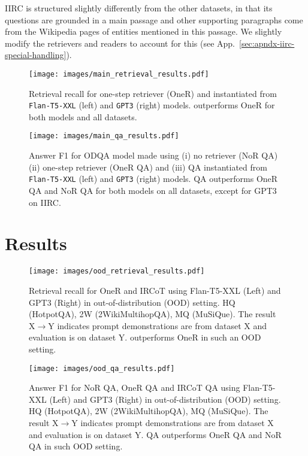 IIRC is structured slightly differently from the other datasets, in that its questions are grounded in a main passage and other supporting paragraphs come from the Wikipedia pages of entities mentioned in this passage. We slightly modify the retrievers and readers to account for this (see App.~\ref{sec:apndx-iirc-special-handling}).

\begin{figure*}[ht]
\centering
\texttt{[image: images/main\_retrieval\_results.pdf]}
\caption{Retrieval recall for one-step retriever (OneR) and \iconsys instantiated from \texttt{Flan-T5-XXL} (left) and \texttt{GPT3} (right) models. \iconsys outperforms OneR for both models and all datasets.}
\label{fig:main-retrieval-results}
\end{figure*}

\begin{figure*}[ht]
\centering
\texttt{[image: images/main\_qa\_results.pdf]}
\caption{Answer F1 for ODQA model made using (i) no retriever (NoR QA) (ii) one-step retriever (OneR QA) and (iii) \iconsys QA instantiated from \texttt{Flan-T5-XXL} (left) and \texttt{GPT3} (right) models. \iconsys QA outperforms OneR QA and NoR QA for both models on all datasets, except for GPT3 on IIRC.}
\label{fig:main-qa-results}
\end{figure*}\section{Results}
\label{sec:exp-results}

\begin{figure*}[ht]
\centering
\texttt{[image: images/ood\_retrieval\_results.pdf]}
\caption{Retrieval recall for OneR and IRCoT using Flan-T5-XXL (Left) and GPT3 (Right) in out-of-distribution (OOD) setting. HQ (HotpotQA), 2W (2WikiMultihopQA), MQ (MuSiQue). The result X$\rightarrow$Y indicates prompt demonstrations are from dataset X and evaluation is on dataset Y. \iconsys outperforms OneR in such an OOD setting.}
\label{fig:ood-retrieval-results}
\end{figure*}

\begin{figure*}[ht]
\centering
\texttt{[image: images/ood\_qa\_results.pdf]}
\caption{Answer F1 for NoR QA, OneR QA and IRCoT QA using Flan-T5-XXL (Left) and GPT3 (Right) in out-of-distribution (OOD) setting. HQ (HotpotQA), 2W (2WikiMultihopQA), MQ (MuSiQue). The result X$\rightarrow$Y indicates prompt demonstrations are from dataset X and evaluation is on dataset Y. \iconsys QA outperforms OneR QA and NoR QA in such OOD setting.}
\label{fig:ood-qa-results}
\end{figure*}

